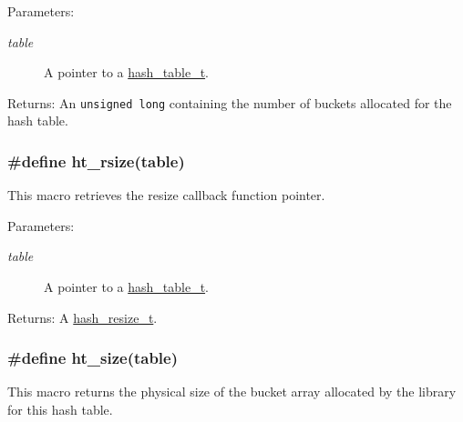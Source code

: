 \begin{Desc}
\item[Parameters:]
\begin{description}
\item[{\em table}]A pointer to a \hyperlink{group__dbprim__hash_a0}{hash\_\-table\_\-t}.\end{description}
\end{Desc}
\begin{Desc}
\item[Returns:]An {\tt unsigned long} containing the number of buckets allocated for the hash table. \end{Desc}
\hypertarget{group__dbprim__hash_a26}{
\subsubsection[ht\_\-rsize]{\setlength{\rightskip}{0pt plus 5cm}\#define ht\_\-rsize(table)}}
\label{group__dbprim__hash_a26}


This macro retrieves the resize callback function pointer.

\begin{Desc}
\item[Parameters:]
\begin{description}
\item[{\em table}]A pointer to a \hyperlink{group__dbprim__hash_a0}{hash\_\-table\_\-t}.\end{description}
\end{Desc}
\begin{Desc}
\item[Returns:]A \hyperlink{group__dbprim__hash_a5}{hash\_\-resize\_\-t}. \end{Desc}
\hypertarget{group__dbprim__hash_a28}{
\subsubsection[ht\_\-size]{\setlength{\rightskip}{0pt plus 5cm}\#define ht\_\-size(table)}}
\label{group__dbprim__hash_a28}


This macro returns the physical size of the bucket array allocated by the library for this hash table.

